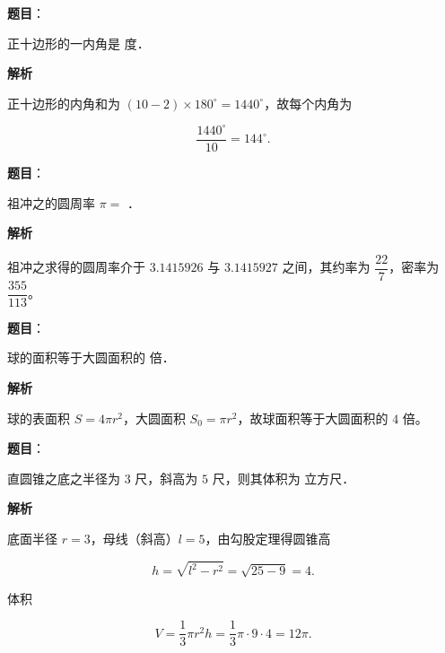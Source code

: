 \begin{answer}

\textbf{题目}：

正十边形的一内角是 \gkblank{} 度．

\textbf{解析}

正十边形的内角和为 $(10-2)\times180^\circ=1440^\circ$，故每个内角为

\nopagebreak[4]
\[
\dfrac{1440^\circ}{10}=144^\circ.
\]


\end{answer}
\begin{answer}

\textbf{题目}：

祖冲之的圆周率 $\pi=$ \gkblank{}．

\textbf{解析}

祖冲之求得的圆周率介于 $3.1415926$ 与 $3.1415927$ 之间，其约率为 $\dfrac{22}{7}$，密率为 $\dfrac{355}{113}$。


\end{answer}
\begin{answer}

\textbf{题目}：

球的面积等于大圆面积的 \gkblank{} 倍．

\textbf{解析}

球的表面积 $S=4\pi r^2$，大圆面积 $S_0=\pi r^2$，故球面积等于大圆面积的 $4$ 倍。


\end{answer}
\begin{answer}

\textbf{题目}：

直圆锥之底之半径为 $3$ 尺，斜高为 $5$ 尺，则其体积为 \gkblank{} 立方尺．

\textbf{解析}

底面半径 $r=3$，母线（斜高）$l=5$，由勾股定理得圆锥高

\nopagebreak[4]
\[
h=\sqrt{l^2-r^2}=\sqrt{25-9}=4.
\]

体积

\nopagebreak[4]
\[
V=\dfrac13\pi r^2h=\dfrac13\pi\cdot9\cdot4=12\pi.
\]


\end{answer}
